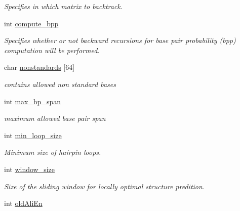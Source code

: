 \begin{DoxyCompactItemize}
\begin{DoxyCompactList}\small\item\em Specifies in which matrix to backtrack. \end{DoxyCompactList}\item 
int \hyperlink{group__model__details_aa0c3e03d9064363e27adcc92b8d0380f}{compute\+\_\+bpp}\hypertarget{group__model__details_aa0c3e03d9064363e27adcc92b8d0380f}{}\label{group__model__details_aa0c3e03d9064363e27adcc92b8d0380f}

\begin{DoxyCompactList}\small\item\em Specifies whether or not backward recursions for base pair probability (bpp) computation will be performed. \end{DoxyCompactList}\item 
char \hyperlink{group__model__details_a3fde4ac9eaf972f503c7a76726cefb59}{nonstandards} \mbox{[}64\mbox{]}\hypertarget{group__model__details_a3fde4ac9eaf972f503c7a76726cefb59}{}\label{group__model__details_a3fde4ac9eaf972f503c7a76726cefb59}

\begin{DoxyCompactList}\small\item\em contains allowed non standard bases \end{DoxyCompactList}\item 
int \hyperlink{group__model__details_a659e5fcc6e8c9f1a68e7de6548eef3b0}{max\+\_\+bp\+\_\+span}\hypertarget{group__model__details_a659e5fcc6e8c9f1a68e7de6548eef3b0}{}\label{group__model__details_a659e5fcc6e8c9f1a68e7de6548eef3b0}

\begin{DoxyCompactList}\small\item\em maximum allowed base pair span \end{DoxyCompactList}\item 
int \hyperlink{group__model__details_a9ed7ba42fcc46915c5c0c524f3d255f5}{min\+\_\+loop\+\_\+size}
\begin{DoxyCompactList}\small\item\em Minimum size of hairpin loops. \end{DoxyCompactList}\item 
int \hyperlink{group__model__details_abea42f9229f8d8d6bcbedef316315bfc}{window\+\_\+size}\hypertarget{group__model__details_abea42f9229f8d8d6bcbedef316315bfc}{}\label{group__model__details_abea42f9229f8d8d6bcbedef316315bfc}

\begin{DoxyCompactList}\small\item\em Size of the sliding window for locally optimal structure predition. \end{DoxyCompactList}\item 
int \hyperlink{group__model__details_ab53aec4503130877973c6111ae6f0f76}{old\+Ali\+En}\hypertarget{group__model__details_ab53aec4503130877973c6111ae6f0f76}{}\label{group__model__details_ab53aec4503130877973c6111ae6f0f76}


\end{DoxyCompactItemize}
